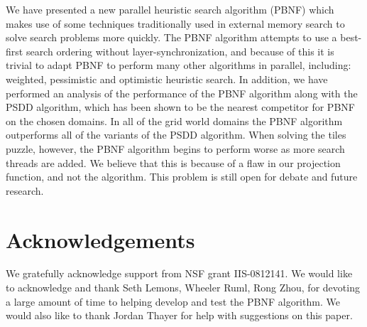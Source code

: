 \documentclass{article}
\begin{document}
We have presented a new parallel heuristic search algorithm (PBNF)
which makes use of some techniques traditionally used in external
memory search to solve search problems more quickly.  The PBNF
algorithm attempts to use a best-first search ordering without
layer-synchronization, and because of this it is trivial to adapt PBNF
to perform many other algorithms in parallel, including: weighted,
pessimistic and optimistic heuristic search.  In addition, we have
performed an analysis of the performance of the PBNF algorithm along
with the PSDD algorithm, which has been shown to be the nearest
competitor for PBNF on the chosen domains.  In all of the grid world
domains the PBNF algorithm outperforms all of the variants of the PSDD
algorithm.  When solving the tiles puzzle, however, the PBNF algorithm
begins to perform worse as more search threads are added.  We believe
that this is because of a flaw in our projection function, and not the
algorithm.  This problem is still open for debate and future research.

\section{Acknowledgements}
We gratefully acknowledge support from NSF grant IIS-0812141.  We
would like to acknowledge and thank Seth Lemons, Wheeler Ruml, Rong
Zhou, for devoting a large amount of time to helping develop and test
the PBNF algorithm.  We would also like to thank Jordan Thayer for
help with suggestions on this paper.



\end{document}
